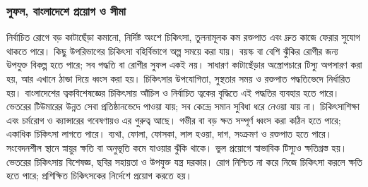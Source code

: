 \subsubsection{সুফল, বাংলাদেশে প্রয়োগ ও সীমা}
নির্বাচিত রোগে বড় কাটাছেঁড়া কমানো, নির্দিষ্ট অংশে চিকিৎসা, তুলনামূলক কম রক্তপাত এবং দ্রুত কাজে ফেরার সুযোগ থাকতে পারে। কিছু উপরিভাগের চিকিৎসা বহির্বিভাগে অল্প সময়ে করা যায়। বয়স্ক বা বেশি ঝুঁকির রোগীর জন্য উপযুক্ত বিকল্প হতে পারে; সব পদ্ধতি বা রোগীর সুফল একই নয়। সাধারণ কাটাছেঁড়ার অস্ত্রোপচারে টিস্যু অপসারণ করা হয়, আর এখানে ঠান্ডা দিয়ে ধ্বংস করা হয়। চিকিৎসার উপযোগিতা, সুস্থতার সময় ও রক্তপাত পদ্ধতিভেদে নির্ধারিত হয়।
বাংলাদেশের ত্বকবিশেষজ্ঞের চিকিৎসায় আঁচিল ও নির্বাচিত ত্বকের বৃদ্ধিতে এই পদ্ধতির ব্যবহার হতে পারে। ভেতরের টিউমারের উন্নত সেবা প্রতিষ্ঠানভেদে পাওয়া যায়; সব কেন্দ্রে সমান সুবিধা ধরে নেওয়া যায় না। চিকিৎসাশিক্ষা এবং চর্মরোগ ও ক্যান্সারের গবেষণায়ও এর গুরুত্ব আছে।
গভীর বা বড় ক্ষত সম্পূর্ণ ধ্বংস করা কঠিন হতে পারে; একাধিক চিকিৎসা লাগতে পারে। ব্যথা, ফোলা, ফোসকা, লাল হওয়া, দাগ, সংক্রমণ ও রক্তপাত হতে পারে। সংবেদনশীল স্থানে স্নায়ুর ক্ষতি বা অনুভূতি কমে যাওয়ার ঝুঁকি থাকে। ভুল প্রয়োগে স্বাভাবিক টিস্যুও ক্ষতিগ্রস্ত হয়। ভেতরের চিকিৎসায় বিশেষজ্ঞ, ছবির সহায়তা ও উপযুক্ত যন্ত্র দরকার। রোগ নিশ্চিত না করে নিজে চিকিৎসা করলে ক্ষতি হতে পারে; প্রশিক্ষিত চিকিৎসকের নির্দেশে প্রয়োগ করতে হয়।
